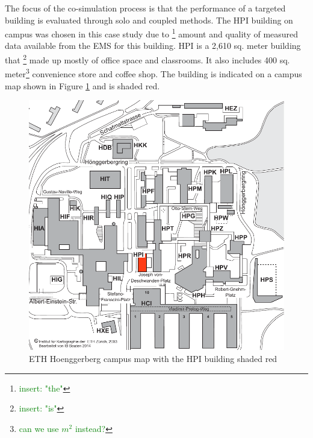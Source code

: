 \documentclass{tBPS2e}
\theoremstyle{plain}
\theoremstyle{definition}
\theoremstyle{remark}
\newcommand{\noteDT}[1]{\footnote{\textcolor{green}{#1}}}
\begin{document}


The focus of the co-simulation process is that the performance of a targeted building is evaluated through solo and coupled methods. The HPI building on campus was chosen in this case study due to \noteDT{insert: "the"} amount and quality of measured data available from the EMS for this building. HPI is a 2,610 sq. meter building that \noteDT{insert: "is"} made up mostly of office space and classrooms. It also includes 400 sq. meter\noteDT{can we use $m^2$ instead?} convenience store and coffee shop. The building is indicated on a campus map shown in Figure \ref{fig:campusmap} and is shaded red.


\begin{figure}[H]
\centering
\includegraphics[scale=0.5]{figures/ETH_Hoenngerbergcamp_targetedbuildings_HPI}
\caption{ETH Hoenggerberg campus map with the HPI building shaded red}
\label{fig:campusmap}
\end{figure}
\end{document}

